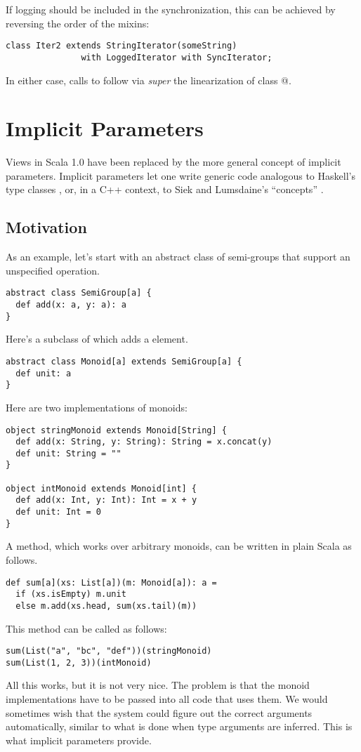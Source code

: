 \documentclass[a4paper,11pt,twoside]{article}
\begin{document}
If logging should be included in the synchronization, this can be
achieved by reversing the order of the mixins:
\begin{lstlisting}
class Iter2 extends StringIterator(someString) 
               with LoggedIterator with SyncIterator;         
\end{lstlisting}
In either case, calls to \lstinline@next@ follow via
{\em super} the linearization of class @.

\section{Implicit Parameters}\label{implicits}

Views in Scala 1.0 have been replaced by the more general concept of
implicit parameters. Implicit parameters let one write generic code
analogous to Haskell's type classes \cite{chen-hudak-odersky:parametric-conf},
or, in a C++ context, to Siek and Lumsdaine's ``concepts'' \cite{siek-lumsdaine:pldi05}.

\subsection*{Motivation}

As an example, let's start with an abstract class of semi-groups that
support an unspecified \lstinline@add@ operation.
\begin{lstlisting}
abstract class SemiGroup[a] {
  def add(x: a, y: a): a
}
\end{lstlisting}
Here's a subclass \lstinline@Monoid@ of \lstinline@SemiGroup@ which adds a
\lstinline@unit@ element.
\begin{lstlisting}
abstract class Monoid[a] extends SemiGroup[a] {
  def unit: a
}
\end{lstlisting}
Here are two implementations of monoids:
\begin{lstlisting}
object stringMonoid extends Monoid[String] {
  def add(x: String, y: String): String = x.concat(y)
  def unit: String = ""
}

object intMonoid extends Monoid[int] {
  def add(x: Int, y: Int): Int = x + y
  def unit: Int = 0
}
\end{lstlisting}
A \lstinline@sum@ method, which works over arbitrary
monoids, can be written in plain Scala as follows.
\begin{lstlisting}
def sum[a](xs: List[a])(m: Monoid[a]): a =
  if (xs.isEmpty) m.unit
  else m.add(xs.head, sum(xs.tail)(m))
\end{lstlisting}
This \lstinline@sum@ method can be called as follows:
\begin{lstlisting}
sum(List("a", "bc", "def"))(stringMonoid)
sum(List(1, 2, 3))(intMonoid)
\end{lstlisting}
All this works, but it is not very nice. The problem is that the
monoid implementations have to be passed into all code that uses them.
We would sometimes wish that the system could figure out the correct
arguments automatically, similar to what is done when type arguments
are inferred. This is what implicit parameters provide.
\end{document}
